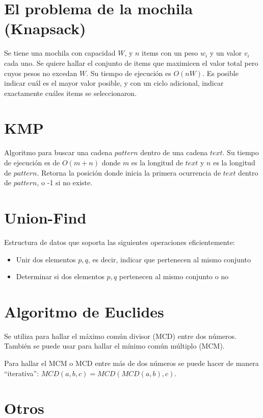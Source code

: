 \documentclass{article}
\begin{document}
\begin{multicols}{2}
\section{El problema de la mochila (Knapsack)}
Se tiene una mochila con capacidad \(W\), y \(n\) items con un peso \(w_i\) y un valor \(v_i\) cada uno. Se quiere hallar el conjunto de items que maximicen el valor total pero cuyos pesos no excedan \(W\). Su tiempo de ejecución es \( O(nW) \). Es posible indicar cuál es el mayor valor posible, y con un ciclo adicional, indicar exactamente cuáles items se seleccionaron.


\section{KMP}
Algoritmo para buscar una cadena \(pattern\) dentro de una cadena \(text\). Su tiempo de ejecución es de \( O(m+n) \) donde \(m\) es la longitud de \(text\) y \(n\) es la longitud de \(pattern\). Retorna la posición donde inicia la primera ocurrencia de \(text\) dentro de \(pattern\), o -1 si no existe.


\section{Union-Find}
Estructura de datos que soporta las siguientes operaciones eficientemente:
\begin{itemize}
\item Unir dos elementos \(p,q\), es decir, indicar que pertenecen al mismo conjunto
\item Determinar si dos elementos \(p,q\) pertenecen al mismo conjunto o no
\end{itemize}


\section{Algoritmo de Euclides}
Se utiliza para hallar el máximo común divisor (MCD) entre dos números. También se puede usar para hallar el mínimo común múltiplo (MCM).

Para hallar el MCM o MCD entre más de dos números se puede hacer de manera ``iterativa'': \( MCD(a, b, c) = MCD(MCD(a, b), c) \).


\section{Otros}

\end{multicols}
\end{document}
